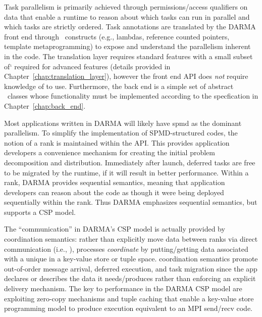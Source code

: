 Task parallelism is primarily achieved through permissions/access qualifiers
on data that enable a runtime to reason about which tasks can run in parallel and which tasks are strictly ordered.
Task annotations are translated by the DARMA front end through \CC\ constructs (e.g., lambdas, reference counted pointers, template
metaprogramming) to expose and understand the parallelism inherent in the code.  
The \gls{translation layer} requires  standard features with a small subset of`
 required for advanced features (details provided in Chapter~\ref{chap:translation_layer}), 
however the \gls{front end} \gls{API} does \emph{not} require knowledge of  to use. 
Furthermore, the \gls{back end} is a simple set of abstract \CC\ classes whose functionality must be implemented
according to the specfication in Chapter~\ref{chap:back_end}.


Most applications written in DARMA will likely have \gls{spmd} as the dominant parallelism.
To simplify the implementation of SPMD-structured codes, the notion of a \gls{rank} is maintained within the \gls{API}.   
This provides application developers a convenience mechanism for creating
the initial problem decomposition and distribution.  
Immediately after launch, deferred tasks are free to be migrated by the runtime, if it will result in better performance. 
Within a \gls{rank}, DARMA provides \gls{sequential semantics},  meaning that application developers can reason about the code as
though it were being deployed sequentially within the rank.   
Thus DARMA emphasizes sequential semantics, but supports a CSP model.


The ``communication'' in DARMA's CSP model is actually provided by \gls{coordination semantics}:  
rather than explicitly move data between ranks via direct communication
(i.e.,  ), processes \emph{coordinate} by putting/getting data associated with a unique  in a
\gls{key-value store} or \gls{tuple space}.  
\Gls{coordination semantics} promote out-of-order message arrival, deferred execution, and task migration
since the app declares or describes the data it needs/produces rather than enforcing an explicit delivery mechanism.
The key to performance in the DARMA CSP model are exploiting zero-copy mechanisms and tuple caching that enable a key-value store programming model
to produce execution equivalent to an MPI send/recv code. 

